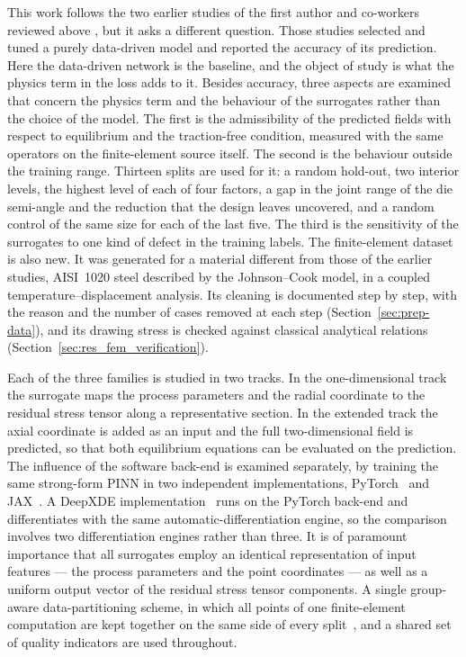 \documentclass[subscriptcorrection,upint,varvw,barcolor=Goldenrod3,mathalfa=cal=euler,balance,hyphenate,french,pdf-a]{asmejour} %
\begin{document}
This work follows the two earlier studies of the first author and co-workers reviewed above \citep{demin2024application,demin2025forecasting}, but it asks a different question. Those studies selected and tuned a purely data-driven model and reported the accuracy of its prediction. Here the data-driven network is the baseline, and the object of study is what the physics term in the loss adds to it. Besides accuracy, three aspects are examined that concern the physics term and the behaviour of the surrogates rather than the choice of the model. The first is the admissibility of the predicted fields with respect to equilibrium and the traction-free condition, measured with the same operators on the finite-element source itself. The second is the behaviour outside the training range. Thirteen splits are used for it: a random hold-out, two interior levels, the highest level of each of four factors, a gap in the joint range of the die semi-angle and the reduction that the design leaves uncovered, and a random control of the same size for each of the last five. The third is the sensitivity of the surrogates to one kind of defect in the training labels. The finite-element dataset is also new. It was generated for a material different from those of the earlier studies, AISI~1020 steel described by the Johnson--Cook model, in a coupled temperature--displacement analysis. Its cleaning is documented step by step, with the reason and the number of cases removed at each step (Section~\ref{sec:prep-data}), and its drawing stress is checked against classical analytical relations (Section~\ref{sec:res_fem_verification}).


Each of the three families is studied in two tracks. In the one-dimensional track the surrogate maps the process parameters and the radial coordinate to the residual stress tensor along a representative section. In the extended track the axial coordinate is added as an input and the full two-dimensional field is predicted, so that both equilibrium equations can be evaluated on the prediction. The influence of the software back-end is examined separately, by training the same strong-form PINN in two independent implementations, PyTorch~\citep{paszke2019pytorch} and JAX~\citep{bradbury2018jax}. A DeepXDE implementation~\citep{lu2021} runs on the PyTorch back-end and differentiates with the same automatic-differentiation engine, so the comparison involves two differentiation engines rather than three.
It is of paramount importance that all surrogates employ an identical representation of input features --- the process parameters and the point coordinates --- as well as a uniform output vector of the residual stress tensor components. A single group-aware data-partitioning scheme, in which all points of one finite-element computation are kept together on the same side of every split~\citep{roberts2017crossvalidation}, and a shared set of quality indicators are used throughout.
\end{document}
